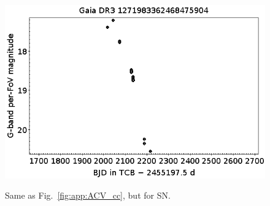 \documentclass[longauth]{aa}
\begin{document}
\begin{appendix}
\begin{figure}
\hspace{2mm}
 \includegraphics[width=0.45\hsize]{figures/appendix/SN-29.png} \\
\vspace{4mm}
 \caption{Same as Fig.~\ref{fig:app:ACV_cc}, but for SN.}
 \label{fig:app:SN_cc}
\end{figure}




\end{appendix}
\end{document}
